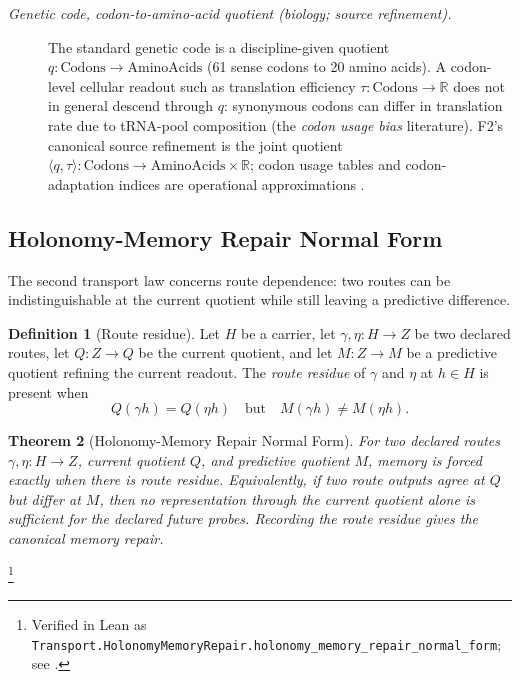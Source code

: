 \documentclass[11pt]{article}
\newcommand{\currQ}{Q}                 \newcommand{\predM}{M}                 \newcommand{\splitObs}{\Delta}         \newcommand{\quotMap}{\pi}             \newcommand{\accessQ}{q_I}             \newcommand{\obsSig}{\sigma_I}         \newcommand{\closureForm}{\mathsf{cl}} \newcommand{\BirdInt}{\mathsf{BirdInt}}
\newtheorem{theorem}{Theorem}[section]
\theoremstyle{definition}
\newtheorem{definition}[theorem]{Definition}
\begin{document}
\begin{description}
\item[\emph{Genetic code, codon-to-amino-acid quotient (biology;
source refinement).}]
The standard genetic code is a discipline-given quotient
\(q : \mathrm{Codons} \to \mathrm{AminoAcids}\) (61 sense codons
to 20 amino acids). A codon-level cellular readout such as
translation efficiency \(\tau : \mathrm{Codons} \to \mathbb{R}\)
does not in general descend through \(q\): synonymous codons can
differ in translation rate due to tRNA-pool composition (the
\emph{codon usage bias} literature). F2's canonical source
refinement is the joint quotient
\(\langle q, \tau\rangle : \mathrm{Codons} \to \mathrm{AminoAcids}
\times \mathbb{R}\); codon usage tables and codon-adaptation
indices are operational approximations \citep{Crick1968GeneticCode}.
\end{description}

\subsection{Holonomy-Memory Repair Normal Form}\label{sec:transport:holonomy-memory}

The second transport law concerns route dependence: two routes can be
indistinguishable at the current quotient while still leaving a
predictive difference.

\begin{definition}[Route residue]\label{def:route-residue}
Let \(H\) be a carrier, let \(\gamma,\eta:H\to Z\) be two declared
routes, let \(\currQ:Z\to Q\) be the current quotient, and let
\(\predM:Z\to M\) be a predictive quotient refining the current
readout.  The \emph{route residue} of \(\gamma\) and \(\eta\) at
\(h\in H\) is present when
\[
  \currQ(\gamma h)=\currQ(\eta h)
  \quad\text{but}\quad
  \predM(\gamma h)\ne\predM(\eta h).
\]
\end{definition}

\begin{theorem}[Holonomy-Memory Repair Normal Form]\label{thm:F3}
For two declared routes \(\gamma,\eta:H\to Z\), current quotient
\(\currQ\), and predictive quotient \(\predM\), memory is forced
exactly when there is route residue.  Equivalently, if two route
outputs agree at \(\currQ\) but differ at \(\predM\), then no
representation through the current quotient alone is sufficient for
the declared future probes.  Recording the route residue gives the
canonical memory repair.
\end{theorem}
\footnote{Verified in Lean as
\texttt{Transport.HolonomyMemoryRepair.\allowbreak{}holonomy\_memory\_repair\_normal\_form};
see .}
\end{document}
